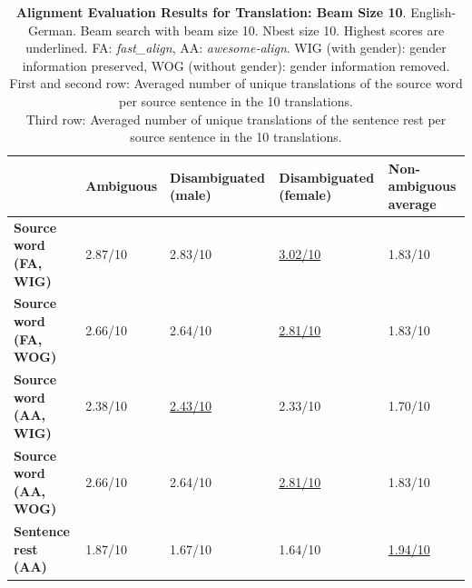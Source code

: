 
\begin{table} 
    \begin{tabularx}{\linewidth}{|X|XXXX|}
        \hline
         & \textbf{Ambiguous} & \textbf{Disambiguated (male)} & \textbf{Disambiguated (female)} & \textbf{Non-ambiguous average} \\ \hline
         \textbf{Source word (FA, WIG)} & 2.87/10 & 2.83/10 & \underline{3.02/10} & 1.83/10 \\
         \textbf{Source word (FA, WOG)} & 2.66/10 & 2.64/10 & \underline{2.81/10} & 1.83/10 \\
         \textbf{Source word (AA, WIG)} & 2.38/10 & \underline{2.43/10} & 2.33/10 & 1.70/10 \\ 
         \textbf{Source word (AA, WOG)} & 2.66/10 & 2.64/10 & \underline{2.81/10} & 1.83/10 \\\hline 
         \textbf{Sentence rest (AA)} & 1.87/10 & 1.67/10 & 1.64/10 & \underline{1.94/10} \\ \hline
    \end{tabularx}
    \caption{\textbf{Alignment Evaluation Results for Translation: Beam Size 10}. English-German. Beam search with beam size 10. Nbest size 10. Highest scores are underlined. FA: \textit{fast\_align}, AA: \textit{awesome-align}. WIG (with gender): gender information preserved, WOG (without gender): gender information removed. \\ First and second row: Averaged number of unique translations of the source word per source sentence in the 10 translations. \\ Third row: Averaged number of unique translations of the sentence rest per source sentence in the 10 translations.}
    \label{tab:alignment_translation_10}
\end{table}

